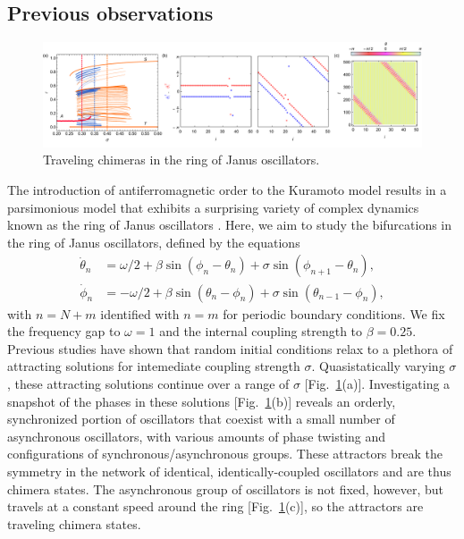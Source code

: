 \documentclass[aps,pre,amsmath,amssymb,floatfix,onecolumn,notitlepage,10pt]{revtex4-1}
\begin{document}
\subsection{Previous observations}
\begin{figure}[hbt]
\includegraphics[width=\columnwidth]{janus}
\caption{Traveling chimeras in the ring of Janus oscillators. \label{fig3}}
\end{figure}
The introduction of antiferromagnetic order to the Kuramoto model results in a parsimonious model that exhibits a surprising variety of complex dynamics known as the ring of Janus oscillators \cite{2019_Nicolaou}.  Here, we aim to study the bifurcations in the ring of Janus oscillators, defined by the equations
\begin{align}
\dot{\theta}_n &= \omega/2 + \beta\sin(\phi_n - \theta_n) + \sigma \sin(\phi_{n+1}-\theta_n), \label{janus1}\\
\dot{\phi}_n &= -\omega/2 + \beta\sin(\theta_n - \phi_n) + \sigma \sin(\theta_{n-1}-\phi_n), \label{janus2}
\end{align}
with $n=N+m$ identified with $n=m$ for periodic boundary conditions. We fix the frequency gap to $\omega=1$ and the internal coupling strength to $\beta=0.25$. Previous studies have shown that random initial conditions relax to a plethora of attracting solutions for intemediate coupling strength $\sigma$. Quasistatically varying $\sigma$, these attracting solutions continue over a range of $\sigma$ [Fig.~\ref{fig3}(a)]. Investigating  a snapshot of the phases in these solutions [Fig.~\ref{fig3}(b)] reveals an orderly, synchronized portion of oscillators that coexist with a small number of asynchronous oscillators, with various amounts of phase twisting and configurations of synchronous/asynchronous groups.  These attractors break the symmetry in the network of identical, identically-coupled oscillators and are thus chimera states.   The asynchronous group of oscillators is not fixed, however, but travels at a constant speed around the ring [Fig.~\ref{fig3}(c)], so the attractors are traveling chimera states.
\end{document}
